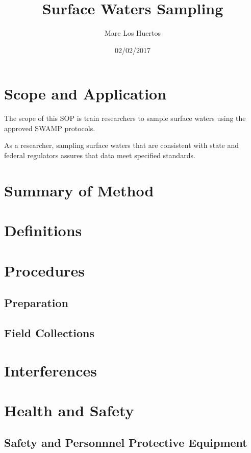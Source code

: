 \documentclass[12pt]{../SOP3_beta}
\title{Surface Waters Sampling}
\date{02/02/2017}
\author{Marc Los Huertos}
\begin{document}


\maketitle

\section{Scope and Application}

\NP The scope of this SOP is train researchers to sample surface waters using the approved SWAMP protocols. 

\NP As a researcher, sampling surface waters that are consistent with state and federal regulators assures that data meet specified standards.

\section{Summary of Method}

\section{Definitions}

\section{Procedures}

\subsection{Preparation}

\subsection{Field Collections}

\NP 

\section{Interferences}

\section{Health and Safety}

\subsection{Safety and Personnnel Protective Equipment}
\end{document}
